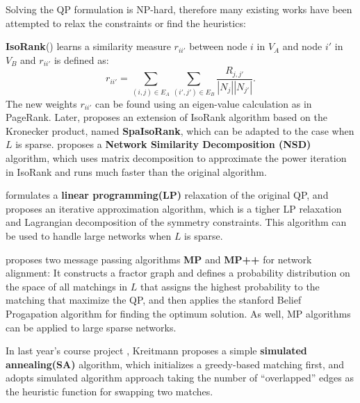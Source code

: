 \documentclass[11pt,letterpaper]{article}
\begin{document}
Solving the QP formulation is NP-hard, therefore many existing works have been attempted to relax the constraints or find the heuristics:

\textbf{IsoRank}(\cite{Singh2008}) learns a similarity measure $r_{ii'}$ between node $i$ in $V_A$ and node $i'$ in $V_B$ and $r_{ii'}$ is defined as:
	\begin{equation*}
           r_{ii'} = \sum_{(i, j) \in E_A}{\sum_{(i', j') \in E_B}{\frac{R_{j, j'}}{|N_j||N_{j'}|}}}.
	\end{equation*}
The new weights $r_{ii'}$ can be found using an eigen-value calculation as in PageRank. Later, \cite{Bayati2009a} proposes an extension of IsoRank algorithm based on the Kronecker product, named \textbf{SpaIsoRank}, which can be adapted to the case when $L$ is sparse. \cite{Kollias2011} proposes a \textbf{Network Similarity Decomposition (NSD)} algorithm, which uses matrix decomposition to approximate the power iteration in IsoRank and runs much faster than the original algorithm.

\cite{Klau2009} formulates a \textbf{linear programming(LP)} relaxation of the original QP, and proposes an iterative approximation algorithm, which is a tigher LP relaxation and Lagrangian decomposition of the symmetry constraints. This algorithm can be used to handle large networks when $L$ is sparse.

\cite{Bayati2009a} proposes two message passing algorithms \textbf{MP} and \textbf{MP++} for network alignment: It constructs a fractor graph and defines a probability distribution on the space of all matchings in $L$ that assigns the highest probability to the matching that maximize the QP, and then applies the stanford Belief Progapation algorithm for finding the optimum solution. As well, MP algorithms can be applied to large sparse networks.

In last year's course project \cite{Kreitmann2011}, Kreitmann proposes a simple \textbf{simulated annealing(SA)} algorithm, which initializes a greedy-based matching first, and adopts simulated algorithm approach taking the number of ``overlapped'' edges as the heuristic function for swapping two matches. 
\end{document}
